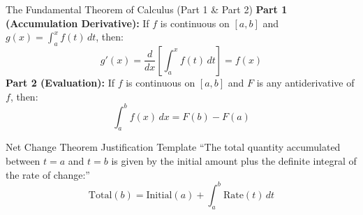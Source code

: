 ﻿\documentclass[11pt,oneside,openany]{book}
\begin{document}
\begin{theorembox}{The Fundamental Theorem of Calculus (Part 1 \& Part 2)}
\textbf{Part 1 (Accumulation Derivative):} If $f$ is continuous on $[a, b]$ and $g(x) = \int_a^x f(t)\,dt$, then:
\[
g'(x) = \frac{d}{dx}\left[\int_a^x f(t)\,dt\right] = f(x)
\]
\textbf{Part 2 (Evaluation):} If $f$ is continuous on $[a, b]$ and $F$ is any antiderivative of $f$, then:
\[
\int_a^b f(x)\,dx = F(b) - F(a)
\]
\end{theorembox}

\begin{frqbox}{Net Change Theorem Justification Template}
``The total quantity accumulated between $t = a$ and $t = b$ is given by the initial amount plus the definite integral of the rate of change:''
\[
\text{Total}(b) = \text{Initial}(a) + \int_a^b \text{Rate}(t)\,dt
\]
\end{frqbox}
\end{document}
